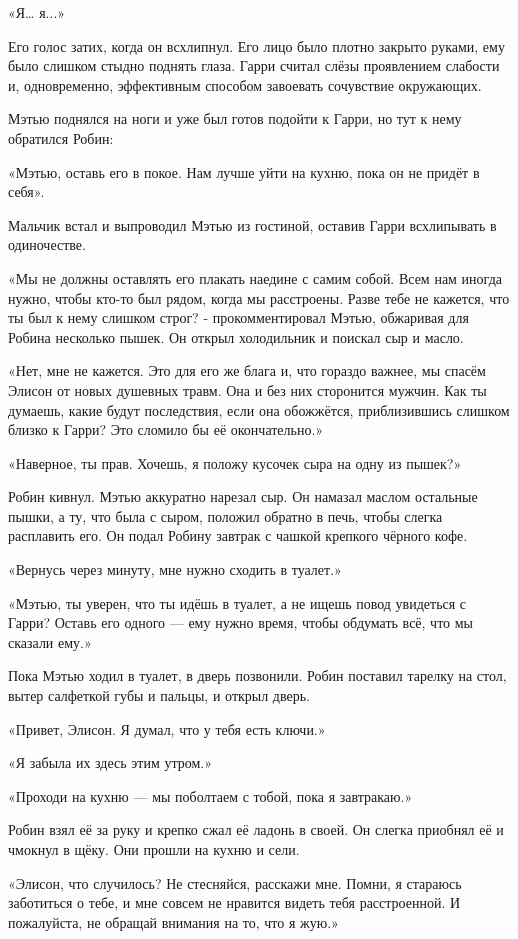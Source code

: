 \documentclass[a5paper, 9pt,
final, openany, twoside=true]{memoir}
\begin{document}
«Я… я...»

Его голос затих, когда он всхлипнул. Его лицо было плотно закрыто руками, ему было слишком стыдно поднять глаза. Гарри считал слёзы проявлением слабости и, одновременно, эффективным способом завоевать сочувствие окружающих.

Мэтью поднялся на ноги и уже был готов подойти к Гарри, но тут к нему обратился Робин:

«Мэтью, оставь его в покое. Нам лучше уйти на кухню, пока он не придёт в себя».

Мальчик встал и выпроводил Мэтью из гостиной, оставив Гарри всхлипывать в одиночестве.

«Мы не должны оставлять его плакать наедине с самим собой. Всем нам иногда нужно, чтобы кто-то был рядом, когда мы расстроены. Разве тебе не кажется, что ты был к нему слишком строг? - прокомментировал Мэтью, обжаривая для Робина несколько пышек. Он открыл холодильник и поискал сыр и масло.

«Нет, мне не кажется. Это для его же блага и, что гораздо важнее, мы спасём Элисон от новых душевных травм. Она и без них сторонится мужчин. Как ты думаешь, какие будут последствия, если она обожжётся, приблизившись слишком близко к Гарри? Это сломило бы её окончательно.»

«Наверное, ты прав. Хочешь, я положу кусочек сыра на одну из пышек?»

Робин кивнул. Мэтью аккуратно нарезал сыр. Он намазал маслом остальные пышки, а ту, что была с сыром, положил обратно в печь, чтобы слегка расплавить его. Он подал Робину завтрак с чашкой крепкого чёрного кофе.

«Вернусь через минуту, мне нужно сходить в туалет.»

«Мэтью, ты уверен, что ты идёшь в туалет, а не ищешь повод увидеться с Гарри? Оставь его одного — ему нужно время, чтобы обдумать всё, что мы сказали ему.»

Пока Мэтью ходил в туалет, в дверь позвонили. Робин поставил тарелку на стол, вытер салфеткой губы и пальцы, и открыл дверь.

«Привет, Элисон. Я думал, что у тебя есть ключи.»

«Я забыла их здесь этим утром.»

«Проходи на кухню — мы поболтаем с тобой, пока я завтракаю.»

Робин взял её за руку и крепко сжал её ладонь в своей. Он слегка приобнял её и чмокнул в щёку. Они прошли на кухню и сели.

«Элисон, что случилось? Не стесняйся, расскажи мне. Помни, я стараюсь заботиться о тебе, и мне совсем не нравится видеть тебя расстроенной. И пожалуйста, не обращай внимания на то, что я жую.»
\end{document}
